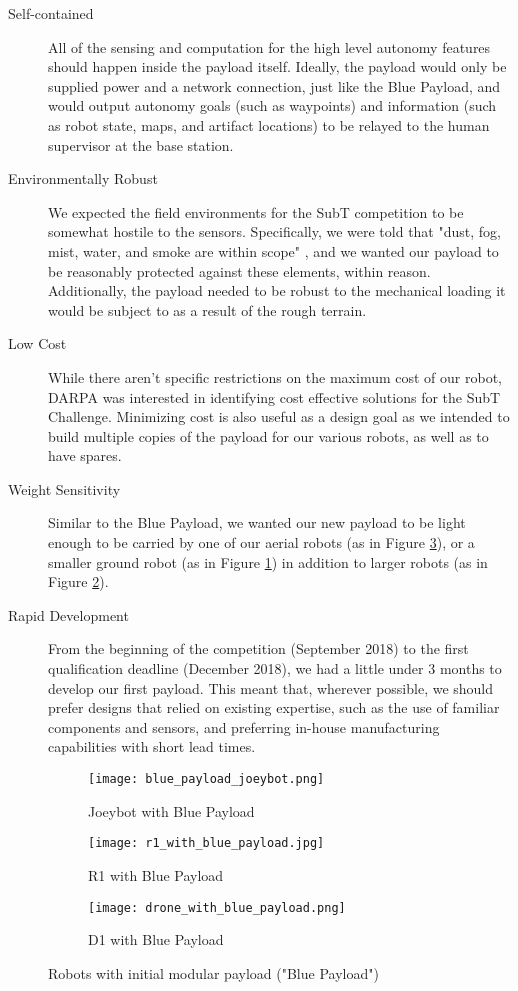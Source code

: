\begin{description}
	\item[Self-contained] All of the sensing and computation for the high level autonomy features should happen inside the payload itself. Ideally, the payload would only be supplied power and a network connection, just like the Blue Payload, and would output autonomy goals (such as waypoints) and information (such as robot state, maps, and artifact locations) to be relayed to the human supervisor at the base station.
	\item[Environmentally Robust] We expected the field environments for the SubT competition to be somewhat hostile to the sensors. Specifically, we were told that "dust, fog, mist, water, and smoke are within scope" \cite{tunnel_rules}, and we wanted our payload to be reasonably protected against these elements, within reason. Additionally, the payload needed to be robust to the mechanical loading it would be subject to as a result of the rough terrain.
	\item[Low Cost] While there aren't specific restrictions on the maximum cost of our robot, DARPA was interested in identifying cost effective solutions for the SubT Challenge. Minimizing cost is also useful as a design goal as we intended to build multiple copies of the payload for our various robots, as well as to have spares.
	\item[Weight Sensitivity] Similar to the Blue Payload, we wanted our new payload to be light enough to be carried by one of our aerial robots (as in Figure \ref{d1 blue payload}), or a smaller ground robot (as in Figure \ref{joeybot blue payload}) in addition to larger robots (as in Figure \ref{r1 blue payload}).
	\item[Rapid Development] From the beginning of the competition (September 2018) to the first qualification deadline (December 2018), we had a little under 3 months to develop our first payload. This meant that, wherever possible, we should prefer designs that relied on existing expertise, such as the use of familiar components and sensors, and preferring in-house manufacturing capabilities with short lead times.
\end{description}

\begin{figure}
	\centering
	\begin{subfigure}{0.3\textwidth}
		\texttt{[image: blue\_payload\_joeybot.png]}
		\caption{Joeybot with Blue Payload}
		\label{joeybot blue payload}
	\end{subfigure}		
	\hfill
	\begin{subfigure}{0.3\textwidth}
		\texttt{[image: r1\_with\_blue\_payload.jpg]}
		\caption{R1 with Blue Payload}
		\label{r1 blue payload}		
	\end{subfigure}
	\hfill
	\begin{subfigure}{0.3\textwidth}
		\texttt{[image: drone\_with\_blue\_payload.png]}
		\caption{D1 with Blue Payload}
		\label{d1 blue payload}
	\end{subfigure}	
	\caption{Robots with initial modular payload ("Blue Payload")}
	\label{blue payload robots}
\end{figure}

